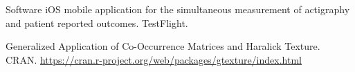 \begin{rubric}{Software}
 iOS mobile application for the simultaneous measurement of actigraphy and patient reported outcomes. TestFlight.

 Generalized Application of Co-Occurrence Matrices and Haralick Texture. CRAN.  \url{https://cran.r-project.org/web/packages/gtexture/index.html}


\end{rubric}